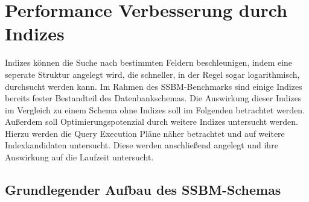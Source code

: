 \chapter{Performance Verbesserung durch Indizes}

Indizes können die Suche nach bestimmten Feldern beschleunigen, indem eine seperate Struktur angelegt wird, die schneller, in der Regel sogar logarithmisch, durchsucht werden kann.
Im Rahmen des SSBM-Benchmarks sind einige Indizes bereits fester Bestandteil des Datenbankschemas. Die Auswirkung dieser Indizes im Vergleich zu einem Schema ohne Indizes soll im Folgenden betrachtet werden. Außerdem soll Optimierungspotenzial durch weitere Indizes untersucht werden.
Hierzu werden die Query Execution Pläne näher betrachtet und auf weitere Indexkandidaten untersucht. Diese werden anschließend angelegt und ihre Auswirkung auf die Laufzeit untersucht.

\section{Grundlegender Aufbau des SSBM-Schemas}
